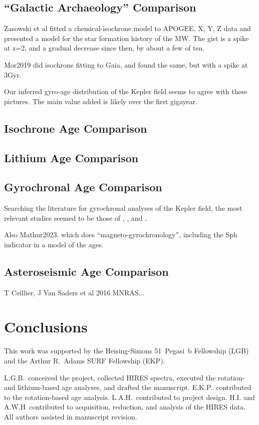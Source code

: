 \documentclass[11pt,twocolumn,tighten]{aastex63}
\begin{document}
\subsection{``Galactic Archaeology'' Comparison}
Zasowski et al fitted a chemical-isochrone model to APOGEE, X, Y, Z
data and presented a model for the star formation history of the MW.
The gist is a spike at z=2, and a gradual decrease since then, by
about a few of ten.

Mor2019 did isochrone fitting to Gaia, and found the same, but with a
spike at 3Gyr.

Our inferred gyro-age distribution of the Kepler field seems to agree
with these pictures.  The main value added is likely over the first
gigayear.

\subsection{Isochrone Age Comparison}

\subsection{Lithium Age Comparison}

\subsection{Gyrochronal Age Comparison}
Searching the literature for gyrochronal analyses of the Kepler field,
the most relevant studies seemed to be those of
\citet{Walkowicz_2013}, \citet{Reinhold_2015}, and 
\citet{David_2021}.

Also Mathur2023, which does ``magneto-gyrochronology'', including the
Sph indicator in a model of the ages.


\subsection{Asteroseismic Age Comparison}
T Ceillier, J Van Saders et al 2016 MNRAS...


\section{Conclusions}
\label{sec:conclusions}

\acknowledgements
This work was supported by the 
Heising-Simons 51~Pegasi~b Fellowship (LGB)
and the Arthur R.~Adams SURF Fellowship (EKP).

L.G.B.~conceived the project, collected HIRES spectra, executed the
rotation- and lithium-based age analyses, and drafted the manuscript.
E.K.P.~contributed to the rotation-based age analysis.
L.A.H.~contributed to project design.
H.I. and A.W.H~contributed to acquisition, reduction, and analysis of
the HIRES data.
All authors assisted in manuscript revision.
\end{document}

